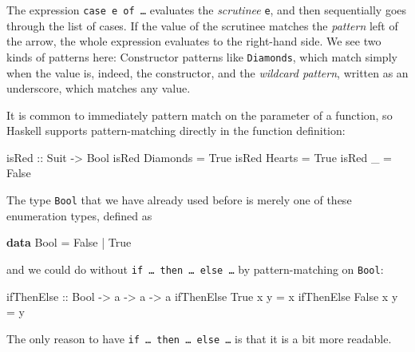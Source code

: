 \documentclass[11pt,
  american,
  DIV13]{article}
\newenvironment{Shaded}{}{}
\newcommand{\DataTypeTok}[1]{\textcolor[rgb]{0.56,0.13,0.00}{#1}}
\newcommand{\KeywordTok}[1]{\textcolor[rgb]{0.00,0.44,0.13}{\textbf{#1}}}
\newcommand{\NormalTok}[1]{#1}
\newcommand{\OperatorTok}[1]{\textcolor[rgb]{0.40,0.40,0.40}{#1}}
\newcommand{\OtherTok}[1]{\textcolor[rgb]{0.00,0.44,0.13}{#1}}
\begin{document}
The expression \texttt{case\ e\ of\ \ldots{}} evaluates the
\emph{scrutinee} \texttt{e}, and then sequentially goes through the list
of cases. If the value of the scrutinee matches the \emph{pattern} left
of the arrow, the whole expression evaluates to the right-hand side. We
see two kinds of patterns here: Constructor patterns like
\texttt{Diamonds}, which match simply when the value is, indeed, the
constructor, and the \emph{wildcard pattern}, written as an underscore,
which matches any value.

It is common to immediately pattern match on the parameter of a
function, so Haskell supports pattern-matching directly in the function
definition:

\begin{Shaded}
\begin{Highlighting}[]
\OtherTok{isRed ::} \DataTypeTok{Suit} \OtherTok{{-}\textgreater{}} \DataTypeTok{Bool}
\NormalTok{isRed }\DataTypeTok{Diamonds} \OtherTok{=} \DataTypeTok{True}
\NormalTok{isRed }\DataTypeTok{Hearts} \OtherTok{=} \DataTypeTok{True}
\NormalTok{isRed \_ }\OtherTok{=} \DataTypeTok{False}
\end{Highlighting}
\end{Shaded}

The type \texttt{Bool} that we have already used before is merely one of
these enumeration types, defined as

\begin{Shaded}
\begin{Highlighting}[]
\KeywordTok{data} \DataTypeTok{Bool} \OtherTok{=} \DataTypeTok{False} \OperatorTok{|} \DataTypeTok{True}
\end{Highlighting}
\end{Shaded}

and we could do without
\texttt{if\ \ldots{}\ then\ \ldots{}\ else\ \ldots{}} by
pattern-matching on \texttt{Bool}:

\begin{Shaded}
\begin{Highlighting}[]
\OtherTok{ifThenElse ::} \DataTypeTok{Bool} \OtherTok{{-}\textgreater{}}\NormalTok{ a }\OtherTok{{-}\textgreater{}}\NormalTok{ a }\OtherTok{{-}\textgreater{}}\NormalTok{ a}
\NormalTok{ifThenElse }\DataTypeTok{True}\NormalTok{ x y }\OtherTok{=}\NormalTok{ x}
\NormalTok{ifThenElse }\DataTypeTok{False}\NormalTok{ x y }\OtherTok{=}\NormalTok{ y}
\end{Highlighting}
\end{Shaded}

The only reason to have
\texttt{if\ \ldots{}\ then\ \ldots{}\ else\ \ldots{}} is that it is a
bit more readable.
\end{document}
